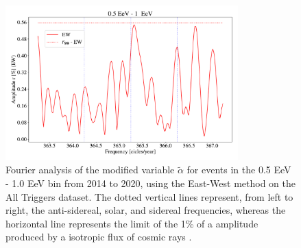 \documentclass[12pt, doublespace, oneside]{article}
\begin{document}
    \begin{figure}[H]
        \begin{small}
            \begin{center}
                \vspace*{-0.9 cm}
                \includegraphics[width=0.8\textwidth]{Figs/plot_bin_2_barrido_v3_EW.pdf}
                
            \end{center}
            \vspace*{-1.1 cm}
            \caption{Fourier analysis of the modified variable $\tilde{\alpha}$ for events in the 0.5 EeV - 1.0 EeV bin from 2014 to 2020, using the East-West method on the All Triggers dataset. The dotted vertical lines represent, from left to right, the anti-sidereal, solar, and sidereal frequencies, whereas the horizontal line represents the limit of the 1\% of a amplitude produced by a isotropic flux of cosmic rays .}
            \label{fig:segundo_barrido}
        \end{small}
    \end{figure}    
\end{document}
